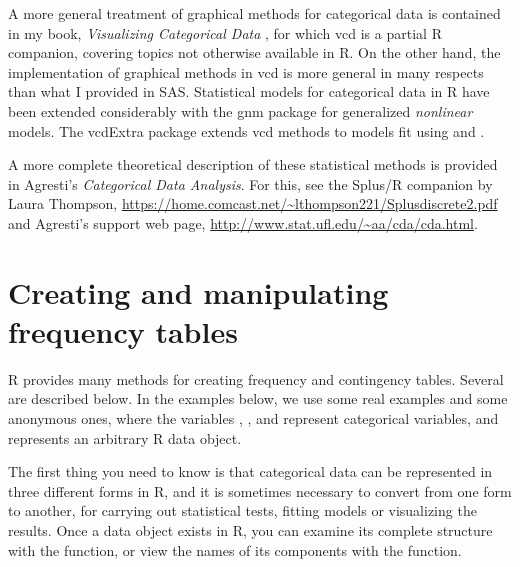 \documentclass[10pt,twoside]{article}\usepackage[]{graphicx}\usepackage[]{color}
\newcommand{\codefun}[1]{\code{#1()}}
\let\proglang=\textsf
\newcommand{\pkg}[1]{{\normalfont\fontseries{b}\selectfont #1}}
\begin{document}
A more general treatment of graphical methods for categorical data is contained
in my book, \emph{Visualizing Categorical Data} \citep{vcd:Friendly:2000}, for which
\pkg{vcd} is a partial \proglang{R} companion, covering topics not otherwise
available in \proglang{R}.  On the other hand, the implementation of graphical
methods in \pkg{vcd} is more general in many respects than what I provided in
\proglang{SAS}. Statistical models for categorical data in \proglang{R} have
been extended considerably with the \pkg{gnm} package for generalized \emph{nonlinear}
models.  The \pkg{vcdExtra} package extends \pkg{vcd} methods to models fit using
\codefun{glm} and \codefun{gnm}.

A more complete theoretical description of these statistical
methods is provided in Agresti's \citeyearpar{vcd:Agresti:2002,Agresti:2013}
\emph{Categorical Data Analysis}. For this, see
the \proglang{Splus/R} companion by Laura Thompson,
\url{https://home.comcast.net/~lthompson221/Splusdiscrete2.pdf}
and Agresti's support web page,
\url{http://www.stat.ufl.edu/~aa/cda/cda.html}.



\section[Creating frequency tables]{Creating and manipulating frequency tables}\label{sec:creating}

\proglang{R} provides many methods for creating frequency and contingency tables. Several are
described below. In the examples below, we use some real examples and some anonymous
ones, where the variables , , and   represent
categorical variables, and  represents an arbitrary \proglang{R} data object.

The first thing you need to know is that categorical data can be represented in
three different forms in \proglang{R}, and it is sometimes necessary to convert
from one form to another, for carrying out statistical tests, fitting models
or visualizing the results.  Once a data object exists in \proglang{R}, 
you can examine its complete structure with
the \codefun{str} function, or view the names of its components with the
\codefun{names} function.
 
\end{document}
